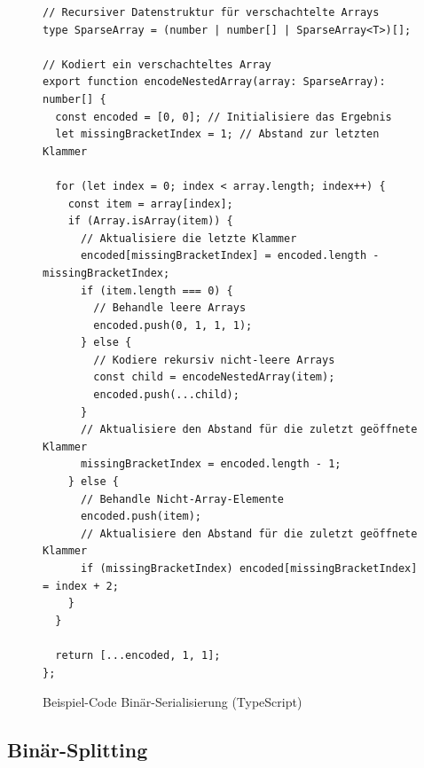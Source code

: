 \documentclass[ngerman]{article}
\begin{document}
\begin{figure}[htbp]
  \begin{code}
    \begin{verbatim}
// Recursiver Datenstruktur für verschachtelte Arrays
type SparseArray = (number | number[] | SparseArray<T>)[];

// Kodiert ein verschachteltes Array
export function encodeNestedArray(array: SparseArray): number[] {
  const encoded = [0, 0]; // Initialisiere das Ergebnis
  let missingBracketIndex = 1; // Abstand zur letzten Klammer

  for (let index = 0; index < array.length; index++) {
    const item = array[index];
    if (Array.isArray(item)) {
      // Aktualisiere die letzte Klammer
      encoded[missingBracketIndex] = encoded.length - missingBracketIndex;
      if (item.length === 0) {
        // Behandle leere Arrays
        encoded.push(0, 1, 1, 1);
      } else {
        // Kodiere rekursiv nicht-leere Arrays
        const child = encodeNestedArray(item);
        encoded.push(...child);
      }
      // Aktualisiere den Abstand für die zuletzt geöffnete Klammer
      missingBracketIndex = encoded.length - 1;
    } else {
      // Behandle Nicht-Array-Elemente
      encoded.push(item);
      // Aktualisiere den Abstand für die zuletzt geöffnete Klammer
      if (missingBracketIndex) encoded[missingBracketIndex] = index + 2;
    }
  }

  return [...encoded, 1, 1];
};
    \end{verbatim}
  \end{code}

  \caption{Beispiel-Code Binär-Serialisierung (TypeScript)}
  \label{sec:data_nested_encoding}

\end{figure}

\pagebreak

\subsection{Binär-Splitting}
\label{sec:code_nested_splitting}
\end{document}
